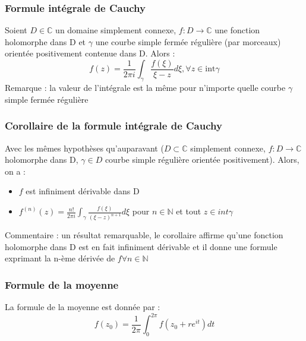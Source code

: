 \documentclass[../main.tex]{subfiles}
\begin{document}
\subsubsection{Formule intégrale de Cauchy}
Soient $D\in \mathbb{C}$ un domaine simplement connexe, $f:D\rightarrow \mathbb{C}$ une fonction holomorphe dans D et $\gamma$ une courbe simple fermée régulière (par morceaux) orientée positivement contenue dans D. Alors :\\
\begin{equation}
    f(z) = \frac{1}{2\pi i}\int_\gamma \frac{f(\xi)}{\xi -z}d\xi, \forall z\in \text{int}\gamma
\end{equation}
\color{gray} Remarque : la valeur de l'intégrale est la même pour n'importe quelle courbe $\gamma$ simple fermée régulière\color{black}\\

\subsubsection{Corollaire de la formule intégrale de Cauchy}
Avec les mêmes hypothèses qu'auparavant ($D\subset \mathbb{C}$ simplement connexe, $f:D\rightarrow \mathbb{C}$ holomorphe dans D, $\gamma \in D$ courbe simple régulière orientée positivement). Alors, on a :\\
\begin{itemize}
    \item $f$ est infiniment dérivable dans D\\
    \item $f^{(n)}(z) = \frac{n!}{2\pi i} \int_\gamma \frac{f(\xi)}{(\xi-z)^{n+1}}d\xi$ pour $n\in \mathbb{N}$ et tout $z \in int \gamma$\\
\end{itemize}

\color{gray} Commentaire : un résultat remarquable, le corollaire affirme qu'une fonction holomorphe dans D est en fait infiniment dérivable et il donne une formule exprimant la n-ème dérivée de $f \forall n\in \mathbb{N}$\color{black}\\

\subsubsection{Formule de la moyenne}
La formule de la moyenne est donnée par :\\
\begin{equation}
    f(z_0) = \frac{1}{2\pi} \int_0^{2\pi} f(z_0+r e^{it}) dt
\end{equation}
\end{document}
